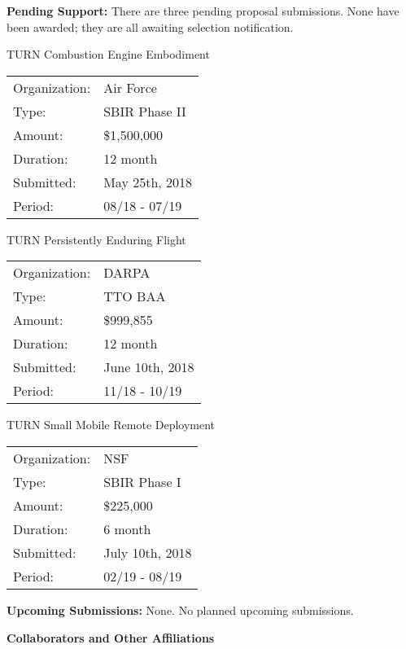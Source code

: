 \documentclass[11pt]{article}
\begin{document}
{\bf Pending Support:}  There are three pending proposal submissions.  None have been awarded; they are all awaiting selection notification.

TURN Combustion Engine Embodiment  \\
\begin{tabular}{ll}
Organization: & Air Force        \\
Type:         & SBIR Phase II    \\
Amount:       & \$1,500,000      \\
Duration:     & 12 month         \\
Submitted:    & May 25th, 2018   \\
Period:       & 08/18 - 07/19    \\
\end{tabular}

TURN Persistently Enduring Flight  \\
\begin{tabular}{ll}
Organization: & DARPA            \\
Type:         & TTO BAA          \\
Amount:       & \$999,855        \\
Duration:     & 12 month         \\
Submitted:    & June 10th, 2018  \\
Period:       & 11/18 - 10/19    \\
\end{tabular}

TURN Small Mobile Remote Deployment  \\
\begin{tabular}{ll}
Organization: & NSF              \\
Type:         & SBIR Phase I     \\
Amount:       & \$225,000        \\
Duration:     & 6 month          \\
Submitted:    & July 10th, 2018  \\
Period:       & 02/19 - 08/19    \\
\end{tabular}


{\bf Upcoming Submissions:}  None. No planned upcoming submissions.








\newpage
{\bf \Huge Collaborators and Other Affiliations}
\end{document}

